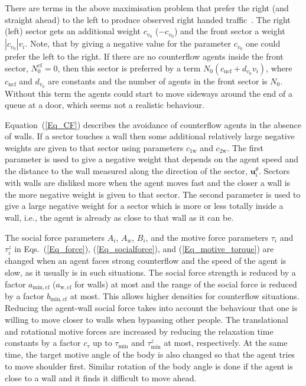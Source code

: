 \documentclass[12pt,a4paper,final,twoside]{stylevk}
\begin{document}
There are terms in the above maximisation problem that prefer the
right (and straight ahead) to the left to produce observed right
handed traffic~\cite{Duisburg}.  The right (left) sector gets an
additional weight $c_{v_0}$ ($-c_{v_0}$) and the front sector a weight
$|c_{v_0}|v_i$.  Note, that by giving a negative value for the
parameter $c_{v_0}$ one could prefer the left to the right.  If there
are no counterflow agents inside the front sector, $N^\mathrm{cf}_0 =
0$, then this sector is preferred by a term $N_0(c_\mathrm{ncf} +
d_{v_0} v_i)$, where $c_\mathrm{ncf}$ and $d_{v_0}$ are constants and
the number of agents in the front sector is $N_0$.  Without this term
the agents could start to move sideways around the end of a queue at a
door, which seems not a realistic behaviour.


Equation~(\ref{Eq_CF}) describes the avoidance of counterflow agents
in the absence of walls.  If a sector touches a wall then some
additional relatively large negative weights are given to that sector
using parameters $c_\mathrm{1w}$ and $c_\mathrm{2w}$.  The first
parameter is used to give a negative weight that depends on the agent
speed and the distance to the wall measured along the direction of the
sector, $\mathbf{u}^\theta_i$.  Sectors with walls are disliked more
when the agent moves fast and the closer a wall is the more negative
weight is given to that sector.  The second parameter is used to give
a large negative weight for a sector which is more or less totally
inside a wall, i.e., the agent is already as close to that wall
as it can be.


The social force parameters $A_i$, $A_w$, $B_i$, and the motive force
parameters $\tau_i$ and $\tau^z_i$ in Eqs.~(\ref{Eq_force}),
(\ref{Eq_socialforce}), and (\ref{Eq_motive_torque}) are changed when
an agent faces strong counterflow and the speed of the agent is slow,
as it usually is in such situations.  The social force strength is
reduced by a factor $a_\mathrm{min,cf}$ ($a_\mathrm{w,cf}$ for walls)
at most and the range of the social force is reduced by a factor
$b_\mathrm{min,cf}$ at most.  This allows higher densities for
counterflow situations.  Reducing the agent-wall social force takes
into account the behaviour that one is willing to move closer to walls
when bypassing other people.  The translational and rotational motive
forces are increased by reducing the relaxation time constants by a
factor $c_\tau$ up to $\tau_\mathrm{min}$ and $\tau_\mathrm{min}^z$ at
most, respectively.  At the same time, the target motive angle of the
body is also changed so that the agent tries to move shoulder first.
Similar rotation of the body angle is done if the agent is close to a
wall and it finds it difficult to move ahead.
\end{document}
